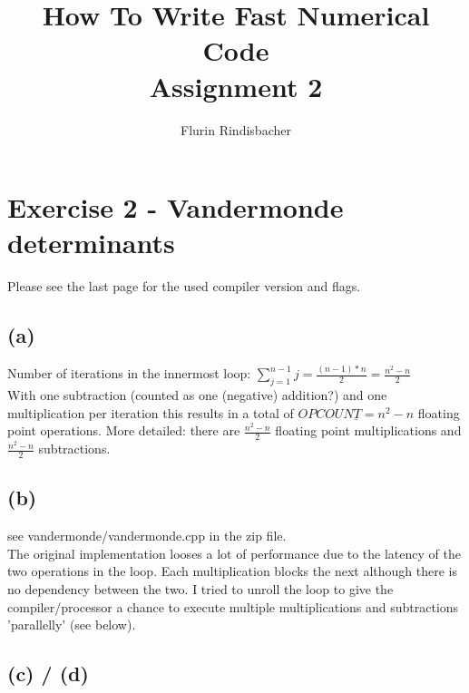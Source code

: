 \documentclass[10pt,a4paper,oneside,notitlepage]{report}
\author{Flurin Rindisbacher}
\title{How To Write Fast Numerical Code \\ \vspace{6 mm} \textbf{Assignment 2}}
\begin{document}
\maketitle

\section*{Exercise 2 - Vandermonde determinants}

Please see the last page for the used compiler version and flags.

\subsection*{(a)}
Number of iterations in the innermost loop: $\sum\limits_{j=1}^{n-1} j = \frac{(n-1)*n}{2} = \frac{n^2 -n}{2}$ \\
With one subtraction (counted as one (negative) addition?) and one multiplication per iteration this results in a total of $\underline{OPCOUNT = n^2-n}$ floating point operations. More detailed: there are $\frac{n^2 -n}{2}$ floating point multiplications and $\frac{n^2 -n}{2}$ subtractions. 

\subsection*{(b)}
see vandermonde/vandermonde.cpp in the zip file. \\
The original implementation looses a lot of performance due to the latency of the two operations in the loop. Each multiplication blocks the next although there is no dependency between the two. I tried to unroll the loop to give the compiler/processor a chance to execute multiple multiplications and subtractions 'parallelly' (see below).

\subsection*{(c) / (d)}	
\end{document}
